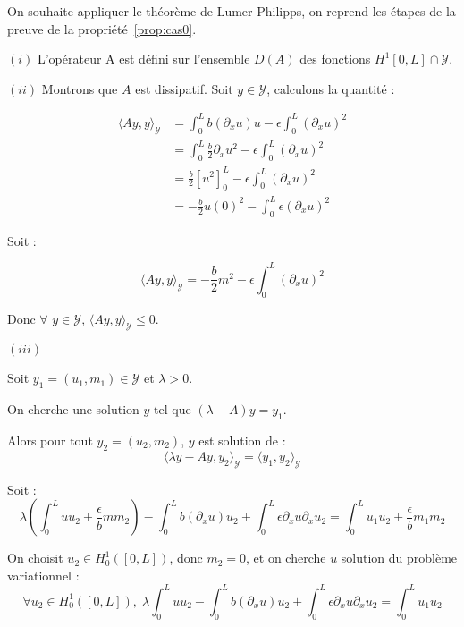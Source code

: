 \documentclass[a4paper]{article}
\newcommand{\dep}{b}
\begin{document}
\begin{preuve}

On souhaite appliquer le théorème de Lumer-Philipps, 
on reprend les étapes de la preuve de la propriété~\ref{prop:cas0}.

$(i)$
L'opérateur A est défini sur l'ensemble $D(A)$ des fonctions $H^1[0,L] \cap \mathscr{Y}$. 


$(ii)$
Montrons que $A$ est dissipatif.
Soit $y \in \mathscr{Y}$, 
calculons la quantité :

\[ \begin{split}
\langle Ay,y \rangle_{\mathscr{Y}} &= \int_0^L \dep (\partial_x u)u
                           - \epsilon \int_0^L (\partial_x u)^2\\
						           &= \int_0^L \displaystyle \frac{\dep}{2} \partial_x u^2
                           - \epsilon \int_0^L (\partial_x u)^2 \\
						           & = \displaystyle \frac{\dep}{2} [u^2]_0^L
                           - \epsilon \int_0^L (\partial_x u)^2 \\
	   						           & = - \displaystyle \frac{\dep}{2} u(0)^2
	                              - \int_0^L \epsilon (\partial_x u)^2
\end{split} \]

Soit :

\[
	\langle Ay,y \rangle_{\mathscr{Y}} = - \displaystyle \frac{\dep}{2} m^2
	                              - \epsilon \int_0^L (\partial_x u)^2 
\]

Donc $\forall$ $y \in \mathscr{Y}$, $\langle Ay,y \rangle_{\mathscr{Y}} \leq 0$.


\vspace{0.3cm}
$(iii)$

Soit $y_1=(u_1,m_1) \in \mathscr{Y}$ et $\lambda >0$.

On cherche une solution $y$ tel que $(\lambda -A)y = y_1$.

Alors pour tout $y_2=(u_2,m_2)$, $y$ est solution de :
\begin{equation}
	\label{eq:surj2}
\langle \lambda y-Ay,y_2 \rangle_{\mathscr{Y}} = \langle y_1,y_2 \rangle_{\mathscr{Y}}
\end{equation}

Soit :
\[
\lambda (\int_0^L u u_2 + \displaystyle \frac{\epsilon}{\dep}mm_2)
- \int_0^L b (\partial_xu)u_2 
+  \int_0^L \epsilon \partial_xu \partial_xu_2
= \int_0^L u_1 u_2 + \displaystyle \frac{\epsilon}{\dep} m_1 m_2
\]

On choisit $u_2\in H_0^1([0,L])$, donc $m_2=0$, et on cherche $u$ solution du problème variationnel :
\[\forall u_2 \in H_0^1([0,L]), \;
\lambda  \int_0^L u u_2
- \int_0^L b (\partial_xu)u_2 
+ \int_0^L \epsilon \partial_xu \partial_xu_2 
= \int_0^L u_1 u_2 \]


\end{preuve}
\end{document}
